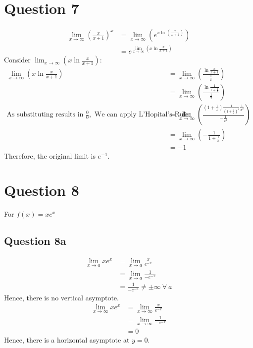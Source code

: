 \documentclass{article}
\begin{document}
\section*{Question 7}
\begin{align*}
    \lim_{x\to\infty}(\frac{x}{x+1})^x & =  \lim_{x\to\infty}(e^{x\ln(\frac{x}{x+1})})                 \\
                                       & =  e^{ \lim_{x\to\infty}(x\ln                 \frac{x}{x+1})}
\end{align*}
Consider $\lim_{x\to\infty}(x\ln\frac{x}{x+1})$:
\begin{align*}
    \lim_{x\to\infty}(x\ln\frac{x}{x+1})                                                  & = \lim_{x\to\infty}(\frac{\ln\frac{x}{x+1}}{\frac{1}{x}})                                           \\
                                                                                          & = \lim_{x\to\infty}(\frac{\ln\frac{1}{1+\frac{1}{x}}}{\frac{1}{x}})                                 \\
    \text{As substituting results in }\frac{0}{0},\text{ We can apply L'Hopital's Rule: } & = \lim_{x\to\infty}(\frac{(1+\frac{1}{x})\frac{1}{(1+\frac{1}{x})^2}\frac{1}{x^2}}{-\frac{1}{x^2}}) \\
                                                                                          & = \lim_{x\to\infty}(-\frac{1}{1+\frac{1}{x}})                                                       \\
                                                                                          & = -1
\end{align*}
Therefore, the original limit is $e^{-1}$.

\section*{Question 8}
For $f(x)=xe^x$
\subsection*{Question 8a}
\begin{align*}
    \lim_{x\to a}xe^x & = \lim_{x\to a}\frac{x}{e^{-x}}                \\
                      & = \lim_{x\to a}\frac{1}{-e^{-x}}               \\
                      & = \frac{1}{-e^{-a}} \ne \pm \infty\ \forall\ a
\end{align*}
Hence, there is no vertical asymptote.
\begin{align*}
    \lim_{x\to\infty}xe^x & = \lim_{x\to\infty}\frac{x}{e^{-x}}  \\
                          & = \lim_{x\to\infty}\frac{1}{-e^{-x}} \\
                          & = 0
\end{align*}
Hence, there is a horizontal asymptote at $y=0$.
\end{document}
